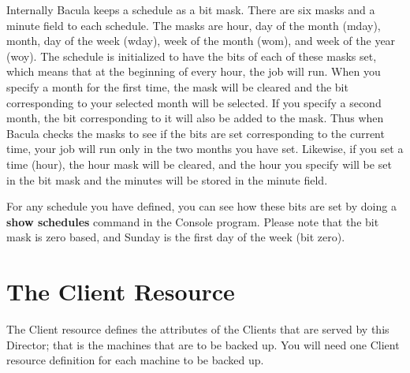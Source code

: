 Internally Bacula keeps a schedule as a bit mask. There are six masks and a
minute field to each schedule. The masks are hour, day of the month (mday),
month, day of the week (wday), week of the month (wom), and week of the year
(woy). The schedule is initialized to have the bits of each of these masks
set, which means that at the beginning of every hour, the job will run. When
you specify a month for the first time, the mask will be cleared and the bit
corresponding to your selected month will be selected. If you specify a second
month, the bit corresponding to it will also be added to the mask. Thus when
Bacula checks the masks to see if the bits are set corresponding to the
current time, your job will run only in the two months you have set. Likewise,
if you set a time (hour), the hour mask will be cleared, and the hour you
specify will be set in the bit mask and the minutes will be stored in the
minute field. 

For any schedule you have defined, you can see how these bits are set by doing
a {\bf show schedules} command in the Console program. Please note that the
bit mask is zero based, and Sunday is the first day of the week (bit zero). 



\section{The Client Resource}
\label{ClientResource2}

The Client resource defines the attributes of the Clients that are served by
this Director; that is the machines that are to be backed up. You will need
one Client resource definition for each machine to be backed up. 

